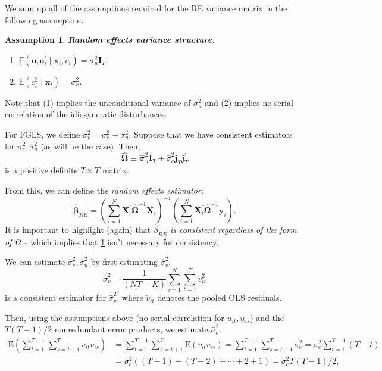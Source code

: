 \documentclass[11pt, a4paper]{report}
\theoremstyle{plain}
\newtheorem{assump}[thm]{Assumption}
\theoremstyle{plain}
\theoremstyle{remark}
\begin{document}
We sum up all of the assumptions required for the RE variance matrix in the following assumption.
\begin{assump}
    \textbf{Random effects variance structure.} \label{re_omega} \begin{enumerate}
        \item $\mathbb{E}\left(\mathbf{u}_{i} \mathbf{u}_{i}^{\prime} \mid \mathbf{x}_{i}, c_{i}\right)=\sigma_{u}^{2} \mathbf{I}_{T} ;$
        \item  $\mathbb{E}\left(c_{i}^{2} \mid \mathbf{x}_{i}\right)=\sigma_{c}^{2}$.
    \end{enumerate}
\end{assump}
Note that (1) implies the unconditional variance of $\sigma_u^2$ and (2) implies no serial correlation of the idiosyncratic disturbances. 

For FGLS, we define $\sigma_v^2 = \sigma_c^2 + \sigma_u^2$. Suppose that we have consistent estimators for $\sigma_c^2, \sigma_u^2$ (as will be the case). Then, 
\begin{equation}
    \hat{\boldsymbol{\Omega}} \equiv \hat{\boldsymbol{\sigma}}_{u}^{2} \mathbf{I}_{T}+\hat{\sigma}_{c}^{2} \mathbf{j}_{T} \mathbf{j}_{T}^{\prime}
    \end{equation}
is a positive definite $T \times T$ matrix. 

From this, we can define the \textit{random effects estimator:}
\begin{equation}
    \hat{\boldsymbol{\beta}}_{R E}=\left(\sum_{i=1}^{N} \mathbf{X}_{i}^{\prime} \hat{\mathbf{\Omega}}^{-1} \mathbf{X}_{i}\right)^{-1}\left(\sum_{i=1}^{N} \mathbf{X}_{i}^{\prime} \hat{\mathbf{\Omega}}^{-1} \mathbf{y}_{i}\right) .
\end{equation}
It is important to highlight (again) that $\hat{\beta}_{RE}$ \textit{is consistent regardless of the form of} $\Omega$ -- which implies that \ref{re_omega} isn't necessary for consistency.

We can estimate $\hat{\sigma}_c^2, \hat{\sigma}_u^2$ by first estimating $\hat{\sigma}_v^2$. 
\begin{equation}
    \hat{\sigma}_{v}^{2}=\frac{1}{(N T-K)} \sum_{i=1}^{N} \sum_{t=1}^{T} \check{v}_{i t}^{2}
    \end{equation}
is a consistent estimator for $\hat{\sigma}_v^2$, where $\check{v}_{i t}$ denotes the pooled OLS residuals. 

Then, using the assumptions above (no serial correlation for $u_{it}, u_{is}$) and the $T(T-1)/2$ nonredundant error products, we estimate $\hat{\sigma}_c^2$. 
\begin{equation}
    \begin{aligned}
    \mathrm{E}\left(\sum_{t=1}^{T-1} \sum_{s=t+1}^{T} v_{i t} v_{i s}\right) &=\sum_{t=1}^{T-1} \sum_{s=t+1}^{T} \mathrm{E}\left(v_{i t} v_{i s}\right)=\sum_{t=1}^{T-1} \sum_{s=t+1}^{T} \sigma_{c}^{2}=\sigma_{c}^{2} \sum_{t=1}^{T-1}(T-t) \\
    &=\sigma_{c}^{2}((T-1)+(T-2)+\cdots+2+1)=\sigma_{c}^{2} T(T-1) / 2,
    \end{aligned}
    \end{equation}
\end{document}
